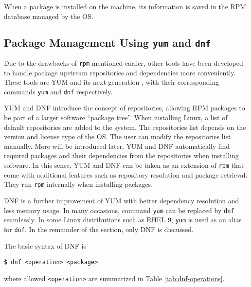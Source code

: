 When a package is installed on the machine, its information is saved in the RPM database managed by the OS.

\subsection{Package Management Using \texttt{yum} and \texttt{dnf}}

Due to the drawbacks of \verb|rpm| mentioned earlier, other tools have been developed to handle package upstream repositories and dependencies more conveniently. These tools are YUM and its next generation , with their corresponding commands \verb|yum| and \verb|dnf| respectively. 

YUM and DNF introduce the concept of repositories, allowing RPM packages to be part of a larger software ``package tree''. When installing Linux, a list of default repositories are added to the system. The repositories list depends on the version and license type of the OS. The user can modify the repositories list manually. More will be introduced later. YUM and DNF automatically find required packages and their dependencies from the repositories when installing software. In this sense, YUM and DNF can be taken as an extension of \verb|rpm| that come with additional features such as repository resolution and package retrieval. They run \verb|rpm| internally when installing packages.

DNF is a further improvement of YUM with better dependency resolution and less memory usage. In many occasions, command \verb|yum| can be replaced by \verb|dnf| seamlessly. In some Linux distributions such as RHEL 9, \verb|yum| is used as an alias for \verb|dnf|. In the remainder of the section, only DNF is discussed.

The basic syntax of DNF is
\begin{lstlisting}
$ dnf <operation> <package>
\end{lstlisting}
where allowed \verb|<operation>| are summarized in Table \ref{tab:dnf-operations}.

